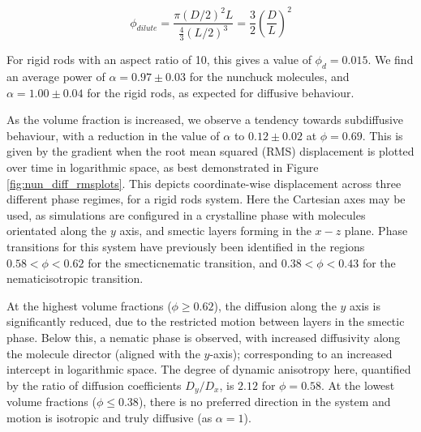 \documentclass[11pt, a4paper]{article} %
\begin{document}
\begin{equation}
\phi_{dilute} = \frac{\pi(D/2)^{2}L}{\frac{4}{3}(L/2)^{3}} = \frac{3}{2} \left( \frac{D}{L}\right)^{2} 
\end{equation}

For rigid rods with an aspect ratio of 10, this gives a value of $\phi_{d} = 0.015$. We find an average power of $ \alpha = 0.97 \pm 0.03 $ for the nunchuck molecules, and $ \alpha = 1.00 \pm 0.04 $ for the rigid rods, as expected for diffusive behaviour. 

As the volume fraction is increased, we observe a tendency towards subdiffusive behaviour, with a reduction in the value of $\alpha$ to $0.12 \pm 0.02 $ at $\phi = 0.69$. This is given by the gradient when the root mean squared (RMS) displacement is plotted over time in logarithmic space, as best demonstrated in Figure \ref{fig:nun_diff_rmsplots}. This depicts coordinate-wise displacement across three different phase regimes, for a rigid rods system. Here the Cartesian axes may be used, as simulations are configured in a crystalline phase with molecules orientated along the $y$ axis, and smectic layers forming in the $x-z$ plane. Phase transitions for this system have previously been identified in the regions $0.58<\phi<0.62$ for the smectic\textendash nematic transition, and $0.38<\phi<0.43$ for the nematic\textendash isotropic transition. 

At the highest volume fractions ($\phi \geq 0.62$), the diffusion along the $y$ axis is significantly reduced, due to the restricted motion between layers in the smectic phase. Below this, a nematic phase is observed, with increased diffusivity along the molecule director (aligned with the $y$-axis); corresponding to an increased intercept in logarithmic space. The degree of dynamic anisotropy here, quantified by the ratio of diffusion coefficients $D_{y}/D_{x}$, is $2.12$ for $\phi = 0.58$. At the lowest volume fractions ($\phi \leq 0.38$), there is no preferred direction in the system and motion is isotropic and truly diffusive (as $\alpha = 1$). 
\end{document}
